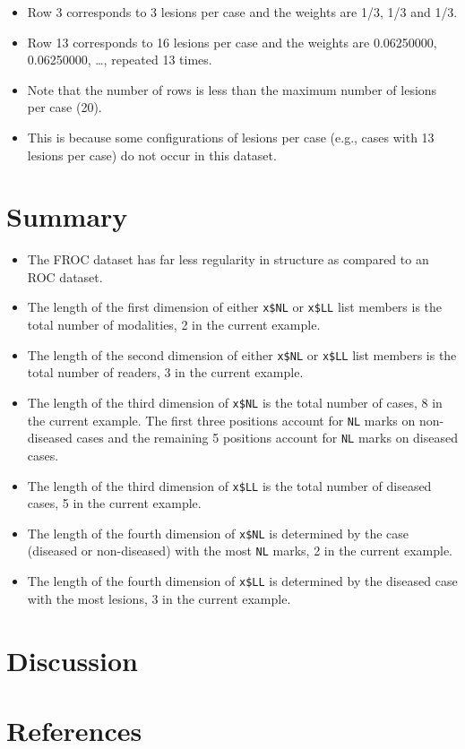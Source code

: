 \documentclass[
]{book}
\providecommand{\tightlist}{%
  \setlength{\itemsep}{0pt}\setlength{\parskip}{0pt}}
\begin{document}
\begin{itemize}
\tightlist
\item
  Row 3 corresponds to 3 lesions per case and the weights are 1/3, 1/3 and 1/3.
\item
  Row 13 corresponds to 16 lesions per case and the weights are 0.06250000, 0.06250000, \ldots, repeated 13 times.
\item
  Note that the number of rows is less than the maximum number of lesions per case (20).
\item
  This is because some configurations of lesions per case (e.g., cases with 13 lesions per case) do not occur in this dataset.
\end{itemize}

\hypertarget{frocdataformat-Summary}{%
\section{Summary}\label{frocdataformat-Summary}}

\begin{itemize}
\tightlist
\item
  The FROC dataset has far less regularity in structure as compared to an ROC dataset.
\item
  The length of the first dimension of either \texttt{x\$NL} or \texttt{x\$LL} list members is the total number of modalities, 2 in the current example.
\item
  The length of the second dimension of either \texttt{x\$NL} or \texttt{x\$LL} list members is the total number of readers, 3 in the current example.
\item
  The length of the third dimension of \texttt{x\$NL} is the total number of cases, 8 in the current example. The first three positions account for \texttt{NL} marks on non-diseased cases and the remaining 5 positions account for \texttt{NL} marks on diseased cases.
\item
  The length of the third dimension of \texttt{x\$LL} is the total number of diseased cases, 5 in the current example.
\item
  The length of the fourth dimension of \texttt{x\$NL} is determined by the case (diseased or non-diseased) with the most \texttt{NL} marks, 2 in the current example.
\item
  The length of the fourth dimension of \texttt{x\$LL} is determined by the diseased case with the most lesions, 3 in the current example.
\end{itemize}

\hypertarget{frocdataformat-Discussion}{%
\section{Discussion}\label{frocdataformat-Discussion}}

\hypertarget{frocdataformat-references}{%
\section{References}\label{frocdataformat-references}}

  
\end{document}
